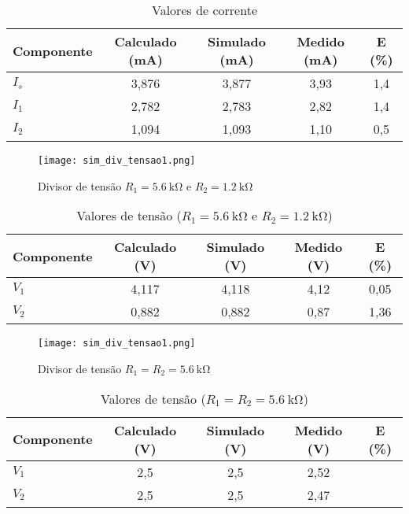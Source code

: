 \documentclass[a4paper, 12pt]{article}
\begin{document}
\begin{table}[H]
\centering
\caption{Valores de corrente}
\label{tab:correntes_div}
\begin{tabular}{|l|c|c|c|c|}
\hline
\textbf{Componente} & \textbf{Calculado (\si{\milli\ampere})} & \textbf{Simulado (\si{\milli\ampere})} & \textbf{Medido (\si{\milli\ampere})} & \textbf{E (\%)} \\
\hline
$I_s$ & 3,876 & 3,877 & 3,93 & 1,4 \\ \hline
$I_1$ & 2,782 & 2,783 & 2,82 & 1,4 \\ \hline
$I_2$ & 1,094 & 1,093 & 1,10 & 0,5 \\ \hline
\end{tabular}
\end{table}

\begin{figure}[H]
\centering
\texttt{[image: sim\_div\_tensao1.png]}
\caption{Divisor de tensão $R_1 = \SI{5,6}{\kilo\ohm}$ e $R_2 = \SI{1,2}{\kilo\ohm}$}
\label{fig:sim_div_tensao1}
\end{figure}

\begin{table}[H]
\centering
\caption{Valores de tensão ($R_1 = \SI{5,6}{\kilo\ohm}$ e $R_2 = \SI{1,2}{\kilo\ohm}$)}
\label{tab:tensoes_div1}
\begin{tabular}{|l|c|c|c|c|}
\hline
\textbf{Componente} & \textbf{Calculado (\si{\volt})} & \textbf{Simulado (\si{\volt})} & \textbf{Medido (\si{\volt})} & \textbf{E (\%)} \\
\hline
$V_1$ & 4,117 & 4,118 & 4,12 & 0,05 \\ \hline
$V_2$ & 0,882 & 0,882 & 0,87 & 1,36 \\ \hline
\end{tabular}
\end{table}

\begin{figure}[H]
\centering
\texttt{[image: sim\_div\_tensao1.png]}
\caption{Divisor de tensão $R_1 = R_2 = \SI{5,6}{\kilo\ohm}$}
\label{fig:sim_div_tensao1}
\end{figure}

\begin{table}[H]
\centering
\caption{Valores de tensão ($R_1 = R_2 = \SI{5,6}{\kilo\ohm}$)}
\label{tab:tensoes_div2}
\begin{tabular}{|l|c|c|c|c|}
\hline
\textbf{Componente} & \textbf{Calculado (\si{\volt})} & \textbf{Simulado (\si{\volt})} & \textbf{Medido (\si{\volt})} & \textbf{E (\%)} \\
\hline
$V_1$ & 2,5 & 2,5 & 2,52 &      \\ \hline
$V_2$ & 2,5 & 2,5 & 2,47 &      \\ \hline
\end{tabular}
\end{table}
\end{document}
